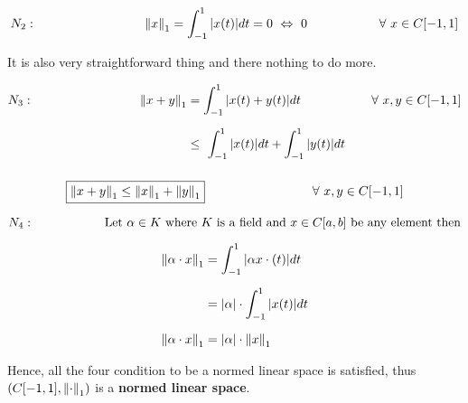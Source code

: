 \documentclass[a4paper,12pt]{article}
\begin{document}
    \[N_2:\hspace*{3cm} \norm{x}_1 = \int_{-1}^{1}|x(t)|dt = 0\ \Leftrightarrow\ 0 \hspace*{2cm} \forall\ x\in C[-1,1]\]

    \begin{center}
        It is also very straightforward thing and there nothing to do more.
    \end{center}

    \pagebreak

    \begin{equation*}
        \begin{split}
            N_3:\hspace*{3cm} \norm{x + y}_1 & = \int_{-1}^{1}|x(t) + y(t)|dt \hspace*{2cm} \forall\ x,y\in C[-1,1]\\[2mm]
            & \leq\ \int_{-1}^{1}|x(t)|dt + \int_{-1}^{1} |y(t)|dt\\[2mm]
        \end{split}
    \end{equation*}

    \begin{center}
        \[\boxed{\norm{x + y}_1 \leq \norm{x}_1 + \norm{y}_1} \hspace*{3cm} \forall\ x,y\in C[-1,1]\]
    \end{center}


    \[N_4:\hspace*{2cm} \mbox{Let}\ \alpha\in K\ \mbox{where $K$ is a field and $x\in C[a,b]$ be any element then}\]

    \begin{equation*}
        \begin{split}
            \norm{\alpha \cdot  x}_1 & = \int_{-1}^{1}|\alpha x \cdot (t)|dt\\[2mm]
            & = |\alpha| \cdot \int_{-1}^{1} |x(t)|dt\\[2mm]
            \norm{\alpha \cdot  x}_1 & = |\alpha| \cdot \norm{x}_1
        \end{split}
    \end{equation*}

    \vspace*{0.2cm}

    Hence, all the four condition to be a normed linear space is satisfied, thus $\left(C[-1,1],\norm{\cdot}_1\right)$ is a {\bf normed linear space}.

    \vspace*{0.5cm}
\end{document}
